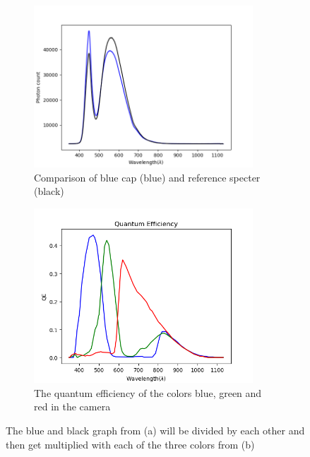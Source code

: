 \begin{figure}[h]
    \begin{subfigure}{0.5\textwidth}
        \centering
        \includegraphics[width=0.9\textwidth]{Plots/blue_cap_original_spectrum_and_background.png}
        \caption{Comparison of blue cap (blue) and reference specter (black)}
        \label{fig:blue_cap_and_reference_spectrum}
    \end{subfigure}%
    \begin{subfigure}{0.5\textwidth}
        \centering
        \includegraphics[width=0.9\textwidth]{Plots/quantum_effiency.png}
        \caption{The quantum efficiency of the colors blue, green and red in the camera}
        \label{fig:quantum_efficiency_camera}
    \end{subfigure}
    \caption{The blue and black graph from (a) will be divided by each other and then get multiplied with each of the three colors from (b)}
\end{figure}

